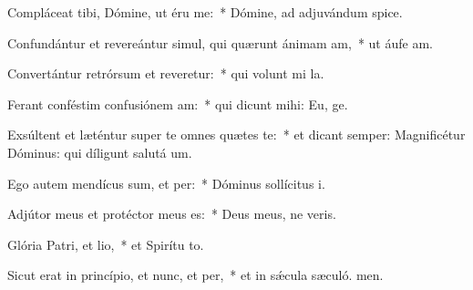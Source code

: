 \item Compláceat tibi, Dómine, ut éru me:~* Dómine, ad adjuvándum  spice.
\item Confundántur et revereántur simul, qui quærunt ánimam am,~* ut áufe am.
\item Convertántur retrórsum et reveretur:~* qui volunt mi la.
\item Ferant conféstim confusiónem am:~* qui dicunt mihi: Eu, ge.
\item Exsúltent et læténtur super te omnes quætes te:~* et dicant semper: Magnificétur Dóminus: qui díligunt salutá um.
\item Ego autem mendícus sum, et per:~* Dóminus sollícitus  i.
\item Adjútor meus et protéctor meus  es:~* Deus meus, ne veris.
\item Glória Patri, et lio,~* et Spirítu to.
\item Sicut erat in princípio, et nunc, et per,~* et in sǽcula sæculó. men.
